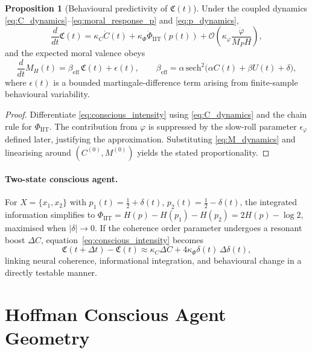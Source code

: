 \documentclass[12pt,a4paper]{article}
\theoremstyle{definition}
\newtheorem{proposition}{Proposition}[section]
\begin{document}
\begin{proposition}[Behavioural predictivity of $\mathfrak{C}(t)$]
Under the coupled dynamics \eqref{eq:C_dynamics}--\eqref{eq:moral_response_p} and \eqref{eq:p_dynamics},
\begin{equation}
\frac{d}{dt} \mathfrak{C}(t) = \kappa_C \dot{C}(t) + \kappa_\Phi \dot{\Phi}_{\text{IIT}}(p(t)) + \mathcal{O}\!\left(\kappa_\varphi \frac{\dot{\varphi}}{M_P H}\right),
\end{equation}
and the expected moral valence obeys
\begin{equation}
\frac{d}{dt} M_H(t) = \beta_{\text{eff}} \, \mathfrak{C}(t) + \epsilon(t), \qquad \beta_{\text{eff}} = \alpha \, \mathrm{sech}^2\!\big(\alpha C(t) + \beta U(t) + \delta\big),
\end{equation}
where $\epsilon(t)$ is a bounded martingale-difference term arising from finite-sample behavioural variability.
\end{proposition}

\begin{proof}
Differentiate \eqref{eq:conscious_intensity} using \eqref{eq:C_dynamics} and the chain rule for $\Phi_{\text{IIT}}$. The contribution from $\varphi$ is suppressed by the slow-roll parameter $\epsilon_\varphi$ defined later, justifying the approximation. Substituting \eqref{eq:M_dynamics} and linearising around $(C^{(0)},M^{(0)})$ yields the stated proportionality.
\end{proof}

\paragraph{Two-state conscious agent.} For $X = \{x_1,x_2\}$ with $p_1(t) = \frac{1}{2} + \delta(t)$, $p_2(t) = \frac{1}{2} - \delta(t)$, the integrated information simplifies to $\Phi_{\text{IIT}} = H(p) - H(p_1) - H(p_2) = 2 H(p) - \log 2$, maximised when $|\delta| \rightarrow 0$. If the coherence order parameter undergoes a resonant boost $\Delta C$, equation~\eqref{eq:conscious_intensity} becomes
\begin{equation}
\mathfrak{C}(t+\Delta t) - \mathfrak{C}(t) \approx \kappa_C \Delta C + 4 \kappa_\Phi \delta(t) \, \Delta \delta(t),
\end{equation}
linking neural coherence, informational integration, and behavioural change in a directly testable manner\cite{McFadden2020}.

\section{Hoffman Conscious Agent Geometry}
\label{sec:hoffmangeometry}
\end{document}
